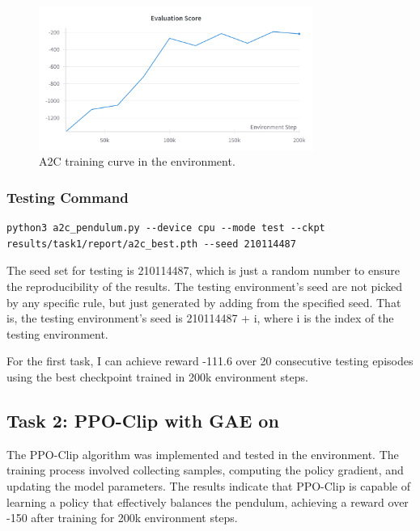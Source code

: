 \begin{figure}[H]
    \centering
    \includegraphics[width=0.8\textwidth]{figures/task1.png}
    \caption{A2C training curve in the \pendulum environment.}
    \label{fig:task1}
\end{figure}

\subsubsection{Testing Command}

\begin{verbatim}
python3 a2c_pendulum.py --device cpu --mode test --ckpt results/task1/report/a2c_best.pth --seed 210114487
\end{verbatim}

The seed set for testing is 210114487, which is just a random number to ensure the reproducibility of the results.
The testing environment's seed are not picked by any specific rule, but just generated by adding from the specified seed.
That is, the testing environment's seed is 210114487 + i, where i is the index of the testing environment.

For the first task, I can achieve reward -111.6 over 20 consecutive testing episodes using the best checkpoint trained in 200k environment steps.

\subsection{Task 2: PPO-Clip with GAE on \pendulum}
\label{sec:task2-discussion}

The PPO-Clip algorithm was implemented and tested in the \pendulum environment.
The training process involved collecting samples, computing the policy gradient, and updating the model parameters.
The results indicate that PPO-Clip is capable of learning a policy that effectively balances the pendulum, achieving a reward over -150 after training for 200k environment steps.

